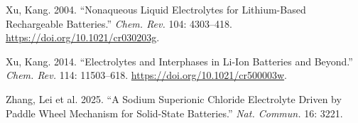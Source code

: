 \documentclass[
  11pt,
]{article}
\newlength{\cslhangindent}
\newenvironment{CSLReferences}[2] %
 {\begin{list}{}{%
  \setlength{\itemindent}{0pt}
  \setlength{\leftmargin}{0pt}
  \setlength{\parsep}{0pt}
  \ifodd #1
   \setlength{\leftmargin}{\cslhangindent}
   \setlength{\itemindent}{-1\cslhangindent}
  \fi
  \setlength{\itemsep}{#2\baselineskip}}}
 {\end{list}}
\begin{document}
\begin{CSLReferences}{1}{1}
Xu, Kang. 2004. {``Nonaqueous Liquid Electrolytes for Lithium-Based
Rechargeable Batteries.''} \emph{Chem. Rev.} 104: 4303--418.
\url{https://doi.org/10.1021/cr030203g}.

Xu, Kang. 2014. {``Electrolytes and Interphases in {Li}-Ion Batteries
and Beyond.''} \emph{Chem. Rev.} 114: 11503--618.
\url{https://doi.org/10.1021/cr500003w}.

{Zhang, Lei et al.} 2025. {``A Sodium Superionic Chloride Electrolyte
Driven by Paddle Wheel Mechanism for Solid-State Batteries.''}
\emph{Nat. Commun.} 16: 3221.

\end{CSLReferences}
\end{document}
